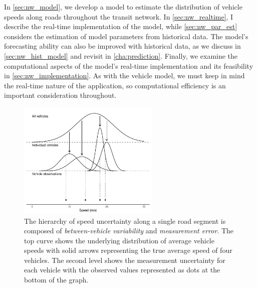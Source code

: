 In \cref{sec:nw_model}, we develop a model to estimate the distribution of vehicle speeds along roads throughout the transit network. In \cref{sec:nw_realtime}, I describe the real-time implementation of the model, while \cref{sec:nw_par_est} considers the estimation of model parameters from historical data. The model's forecasting ability can also be improved with historical data, as we discuss in \cref{sec:nw_hist_model} and revisit in \cref{cha:prediction}. Finally, we examine the computational aspects of the model's real-time implementation and its feasibility in \cref{sec:nw_implementation}. As with the vehicle model, we must keep in mind the real-time nature of the application, so computational efficiency is an important consideration throughout.


\begin{knitrout}\small
{}\color{fgcolor}\begin{figure}

{\centering \includegraphics[width=0.6\textwidth]{figure/nw_model_hierarchy-1} 

}

\caption[The hierarchy of speed uncertainty along a single road segment]{The hierarchy of speed uncertainty along a single road segment is composed of \emph{between-vehicle variability} and \emph{measurement error}. The top curve shows the underlying distribution of average vehicle speeds with solid arrows representing the true average speed of four vehicles. The second level shows the measurement uncertainty for each vehicle with the observed values represented as dots at the bottom of the graph.}\label{fig:nw_model_hierarchy}
\end{figure}


\end{knitrout}







